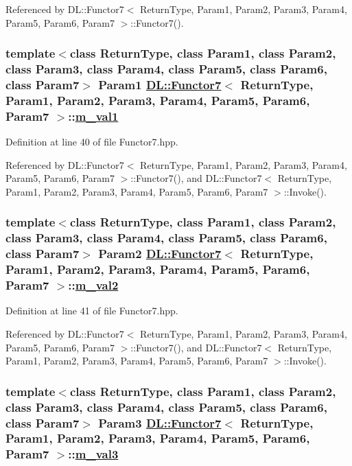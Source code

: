 Referenced by DL::Functor7$<$ Return\-Type, Param1, Param2, Param3, Param4, Param5, Param6, Param7 $>$::Functor7().\hypertarget{classDL_1_1Functor7_r1}{
\subsubsection[m\_\-val1]{\setlength{\rightskip}{0pt plus 5cm}template$<$class Return\-Type, class Param1, class Param2, class Param3, class Param4, class Param5, class Param6, class Param7$>$ Param1 \hyperlink{classDL_1_1Functor7}{DL::Functor7}$<$ Return\-Type, Param1, Param2, Param3, Param4, Param5, Param6, Param7 $>$::\hyperlink{classDL_1_1Functor7_r1}{m\_\-val1}}}
\label{classDL_1_1Functor7_r1}




Definition at line 40 of file Functor7.hpp.

Referenced by DL::Functor7$<$ Return\-Type, Param1, Param2, Param3, Param4, Param5, Param6, Param7 $>$::Functor7(), and DL::Functor7$<$ Return\-Type, Param1, Param2, Param3, Param4, Param5, Param6, Param7 $>$::Invoke().\hypertarget{classDL_1_1Functor7_r2}{
\subsubsection[m\_\-val2]{\setlength{\rightskip}{0pt plus 5cm}template$<$class Return\-Type, class Param1, class Param2, class Param3, class Param4, class Param5, class Param6, class Param7$>$ Param2 \hyperlink{classDL_1_1Functor7}{DL::Functor7}$<$ Return\-Type, Param1, Param2, Param3, Param4, Param5, Param6, Param7 $>$::\hyperlink{classDL_1_1Functor7_r2}{m\_\-val2}}}
\label{classDL_1_1Functor7_r2}




Definition at line 41 of file Functor7.hpp.

Referenced by DL::Functor7$<$ Return\-Type, Param1, Param2, Param3, Param4, Param5, Param6, Param7 $>$::Functor7(), and DL::Functor7$<$ Return\-Type, Param1, Param2, Param3, Param4, Param5, Param6, Param7 $>$::Invoke().\hypertarget{classDL_1_1Functor7_r3}{
\subsubsection[m\_\-val3]{\setlength{\rightskip}{0pt plus 5cm}template$<$class Return\-Type, class Param1, class Param2, class Param3, class Param4, class Param5, class Param6, class Param7$>$ Param3 \hyperlink{classDL_1_1Functor7}{DL::Functor7}$<$ Return\-Type, Param1, Param2, Param3, Param4, Param5, Param6, Param7 $>$::\hyperlink{classDL_1_1Functor7_r3}{m\_\-val3}}}
\label{classDL_1_1Functor7_r3}




